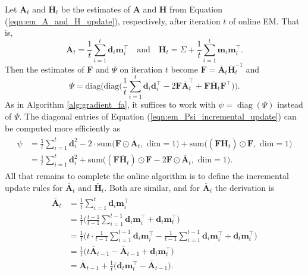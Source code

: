 \documentclass[msc,deptreport.inf]{infthesis} %
\newcommand{\matr}[1]{\mathbf{#1}}
\newcommand{\diag}{\mathop{\mathrm{diag}}}
\begin{document}
Let $\overline{\matr{A}}_t$ and $\overline{\matr{H}}_t$ be the estimates of $\matr{A}$ and $\matr{H}$ from Equation (\ref{eqn:em_A_and_H_update}), respectively, after iteration $t$ of online EM. That is,
\begin{equation}\label{eqn:em_A_and_H_incremental_update}
	\overline{\matr{A}}_t = \frac{1}{t} \sum_{i=1}^t \matr{d}_i \matr{m}_i^\intercal \quad \text{and} \quad 
	\overline{\matr{H}}_t = \Sigma + \frac{1}{t} \sum_{i=1}^t \matr{m}_i \matr{m}_i^\intercal.
\end{equation}
Then the estimates of $\matr{F}$ and $\Psi$ on iteration $t$ become $\matr{F} = \overline{\matr{A}}_t \overline{\matr{H}}_t^{-1}$ and
\begin{equation}\label{eqn:em_Psi_incremental_update}
	\Psi = \text{diag}\Bigg(\text{diag}\Bigg( \frac{1}{t} \sum_{i=1}^t \matr{d}_i \matr{d}_i^\intercal - 2 \matr{F}\overline{\matr{A}}_t^\intercal + \matr{F}\overline{\matr{H}}_t \matr{F}^\intercal \Bigg)\Bigg).
\end{equation}
As in Algorithm \ref{alg:gradient_fa}, it suffices to work with $\psi = \diag(\Psi)$ instead of $\Psi$. 
The diagonal entries of Equation (\ref{eqn:em_Psi_incremental_update}) can be computed more efficiently as 
\begin{align}
\begin{split}\label{eqn:em_Psi_efficient_update}
	\psi 
	& = \frac{1}{t} \sum_{i=1}^t \matr{d}_i^2 
	- 2 \cdot \text{sum} \big(\matr{F} \odot \overline{\matr{A}}_t, \text{ dim} = 1\big)
	+ \text{sum}\big((\matr{F} \overline{\matr{H}}_t) \odot \matr{F}, \text{ dim} = 1\big) \\	
	& = \frac{1}{t} \sum_{i=1}^t \matr{d}_i^2 
	+ \text{sum} \big((\matr{F} \overline{\matr{H}}_t) \odot \matr{F} -2\matr{F} \odot \overline{\matr{A}}_t , \text{ dim} = 1\big).
\end{split}
\end{align}
All that remains to complete the online algorithm is to define the incremental update rules for $\overline{\matr{A}}_t$ and $\overline{\matr{H}}_t$. Both are similar, and for $\overline{\matr{A}}_t$ the derivation is 
\begin{align}
\begin{split}
	\overline{\matr{A}}_t 
	& = \frac{1}{t} \sum_{i=1}^t \matr{d}_i \matr{m}_i^\intercal \\
	& = \frac{1}{t}\Bigg(\frac{t-1}{t-1} \sum_{i=1}^{t-1} \matr{d}_i \matr{m}_i^\intercal + \matr{d}_t \matr{m}_t^\intercal \Bigg) \\
	& = \frac{1}{t}\Bigg(t \cdot \frac{1}{t-1} \sum_{i=1}^{t-1} \matr{d}_i \matr{m}_i^\intercal - \frac{1}{t-1} \sum_{i=1}^{t-1} \matr{d}_i \matr{m}_i^\intercal + \matr{d}_t \matr{m}_t^\intercal \Bigg) \\
	& = \frac{1}{t}\Big(t \overline{\matr{A}}_{t-1} - \overline{\matr{A}}_{t-1} + \matr{d}_t \matr{m}_t^\intercal \Big) \\
	& = \overline{\matr{A}}_{t-1} + \frac{1}{t} \big(\matr{d}_t \matr{m}_t^\intercal - \overline{\matr{A}}_{t-1} \big).
\end{split}
\end{align}
\end{document}
